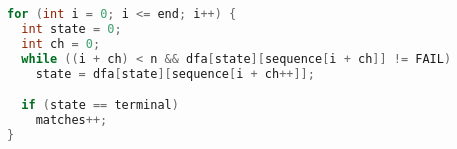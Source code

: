 \begin{lstlisting}[language=C,caption={C/C++ DFA-Gap main loop},label={lst:dfa_c}]
for (int i = 0; i <= end; i++) {
  int state = 0;
  int ch = 0;
  while ((i + ch) < n && dfa[state][sequence[i + ch]] != FAIL)
    state = dfa[state][sequence[i + ch++]];

  if (state == terminal)
    matches++;
}
\end{lstlisting}
